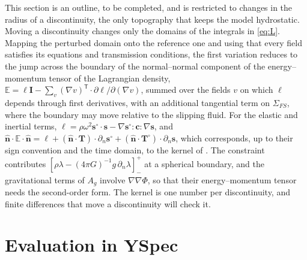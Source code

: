 \documentclass[11pt,a4paper]{article}
\newcommand{\bs}{\mathbf{s}}
\newcommand{\bc}{\mathbf{c}}
\newcommand{\bT}{\mathbf{T}}
\newcommand{\bn}{\hat{\mathbf{n}}}
\newcommand{\bI}{\mathbf{I}}
\newcommand{\sd}{\mathbf{s}^\circ}
\newcommand{\jump}[1]{\left[#1\right]^+_-}
\theoremstyle{remark}
\begin{document}
This section is an outline, to be completed, and is restricted to changes in
the radius of a discontinuity, the only topography that keeps the model
hydrostatic. Moving a discontinuity changes only the domains of the
integrals in \eqref{eq:L}. Mapping the perturbed
domain onto the reference one and using that every field satisfies its
equations and transmission conditions, the first variation reduces to the
jump across the boundary of the normal--normal component of the
energy--momentum tensor of the Lagrangian density,
$\mathbb{E} = \ell\bI - \sum_v(\nabla v)^{\mathsf T}\cdot\partial\ell/
\partial(\nabla v)$, summed over the fields $v$ on which $\ell$ depends
through first derivatives, with an additional tangential term on
$\Sigma_{FS}$, where the boundary may move relative to the slipping fluid.
For the elastic and inertial terms, $\ell = \rho\omega^2\sd\cdot\bs -
\nabla\sd:\bc:\nabla\bs$, and $\bn\cdot\mathbb{E}\cdot\bn = \ell +
(\bn\cdot\bT)\cdot\partial_n\sd + (\bn\cdot\bT^\circ)\cdot\partial_n\bs$,
which corresponds, up to their sign convention and the time domain, to the
kernel of \citet[][eq.~60]{LiuTromp2008}. The constraint
contributes $\jump{\rho\lambda - (4\pi G)^{-1}g\,\partial_n\lambda}$ at a
spherical boundary, and the gravitational terms of $A_g$ involve
$\nabla\nabla\Phi$, so that their energy--momentum tensor needs the
second-order form. The kernel is one number per discontinuity, and finite
differences that move a discontinuity will check it.

\section{Evaluation in YSpec}\label{sec:yspec}
\end{document}
